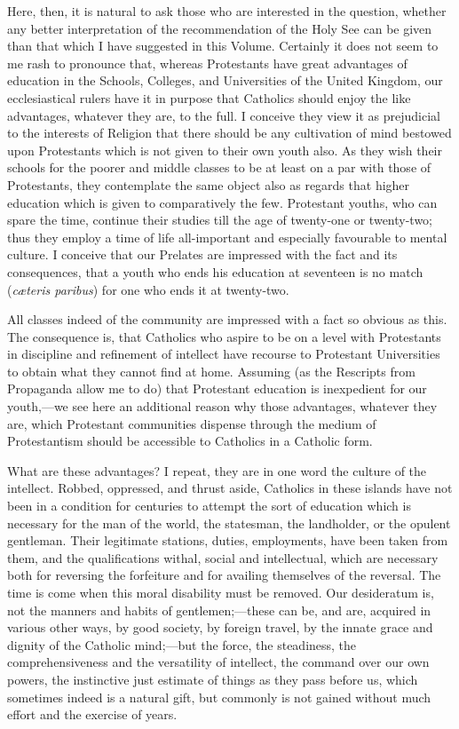 Here, then, it is natural to ask those who are interested in the
question, whether any better interpretation of the recommendation of the
Holy See can be given than that which I have suggested in this Volume.
Certainly it does not seem to me rash to pronounce that, whereas
Protestants have great advantages of education in the Schools, Colleges,
and Universities of the United Kingdom, our ecclesiastical rulers have
it in purpose that Catholics should enjoy the like advantages, whatever
they are, to the full. I conceive they view it as prejudicial to
the interests of Religion that there should be any cultivation of mind
bestowed upon Protestants which is not given to their own youth also. As
they wish their schools for the poorer and middle classes to be at least
on a par with those of Protestants, they contemplate the same object
also as regards that higher education which is given to comparatively
the few. Protestant youths, who can spare the time, continue their
studies till the age of twenty-one or twenty-two; thus they employ a
time of life all-important and especially favourable to mental culture.
I conceive that our Prelates are impressed with the fact and its
consequences, that a youth who ends his education at seventeen is no
match (\emph{cæteris paribus}) for one who ends it at twenty-two.

All classes indeed of the community are impressed with a fact so
obvious as this. The consequence is, that Catholics who aspire to be on
a level with Protestants in discipline and refinement of intellect have
recourse to Protestant Universities to obtain what they cannot find at
home. Assuming (as the Rescripts from Propaganda allow me to do) that
Protestant education is inexpedient for our youth,—we see here an
additional reason why those advantages, whatever they are, which
Protestant communities dispense through the medium of Protestantism
should be accessible to Catholics in a Catholic form.

What are these advantages? I repeat, they are in one word the culture
of the intellect. Robbed, oppressed, and thrust aside, Catholics in
these islands have not been in a condition for centuries to attempt the
sort of education which is necessary for the man of the world, the
statesman, the landholder, or the opulent gentleman. Their legitimate
stations, duties, employments, have been taken from them, and the
qualifications withal, social and intellectual, which are necessary both
for reversing the forfeiture and for availing themselves of the
reversal. The time is come when this moral disability must be removed.
Our desideratum is, not the manners and habits of gentlemen;—these can
be, and are, acquired in various other ways, by good society, by foreign
travel, by the innate grace and dignity of the Catholic mind;—but the
force, the steadiness, the comprehensiveness and the versatility of
intellect, the command over our own powers, the instinctive just
estimate of things as they pass before us, which sometimes indeed is a
natural gift, but commonly is not gained without much effort and the
exercise of years.

